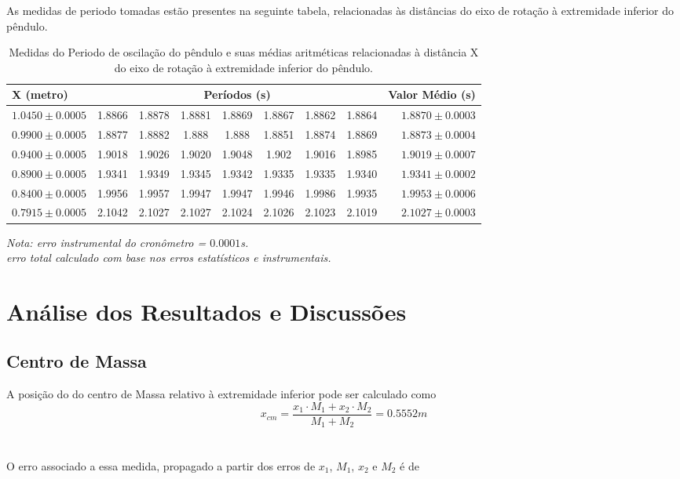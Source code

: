 \documentclass[12pt,a4paper]{article}
\begin{document}
As medidas de periodo tomadas estão presentes na seguinte tabela, relacionadas às distâncias do eixo de rotação à extremidade inferior do pêndulo. \\

\begin{table}[!htbp]
\centering
\caption{ Medidas do Periodo de oscilação do pêndulo e suas médias aritméticas relacionadas à distância X do eixo de rotação à extremidade inferior do pêndulo.} 	%

\def\arraystretch{1.5}
\begin{tabular}{|l| c c c c c c c|r|}
\hline 
X (metro) & \multicolumn{7}{c|}{Períodos (s)} & {Valor Médio (s)} \\ 
\hline
$1.0450\pm0.0005$ & 1.8866 & 1.8878 & 1.8881 & 1.8869 & 1.8867 & 1.8862 & 1.8864 & $1.8870 \pm 0.0003 $ \\
\hline
$0.9900\pm0.0005$ & 1.8877 & 1.8882 & 1.888 & 1.888 & 1.8851 & 1.8874 & 1.8869 & $1.8873 \pm 0.0004 $\\
\hline
$0.9400\pm0.0005$ & 1.9018 & 1.9026 & 1.9020 & 1.9048 & 1.902 & 1.9016 & 1.8985 & $1.9019 \pm 0.0007$\\
\hline
$0.8900\pm0.0005$ & 1.9341 & 1.9349 & 1.9345 & 1.9342 & 1.9335 & 1.9335 & 1.9340 & $1.9341 \pm 0.0002$\\
\hline
$0.8400\pm0.0005$ & 1.9956 & 1.9957 & 1.9947 & 1.9947 & 1.9946 & 1.9986 & 1.9935 & $1.9953 \pm 0.0006$\\
\hline
$0.7915\pm0.0005$ & 2.1042 & 2.1027 & 2.1027 & 2.1024 & 2.1026 & 2.1023 & 2.1019 & $2.1027 \pm 0.0003 $\\
\hline
\end{tabular}

\emph{Nota: erro instrumental do cronômetro = $0.0001$s.\\ erro total calculado com base nos erros estatísticos e instrumentais.}
\end{table}
\newpage


\section{Análise dos Resultados e Discussões}
\subsection{Centro de Massa}
A posição do do centro de Massa relativo à extremidade inferior pode ser calculado como\\
$$ x_{cm} = \frac{x_1 \cdot M_1 + x_2 \cdot M_2}{M_1 + M_2} = 0.5552 m $$\\ \\
O erro associado a essa medida, propagado a partir dos erros de $x_1$, $M_1$, $x_2$ e $M_2$ é de 
\end{document}
